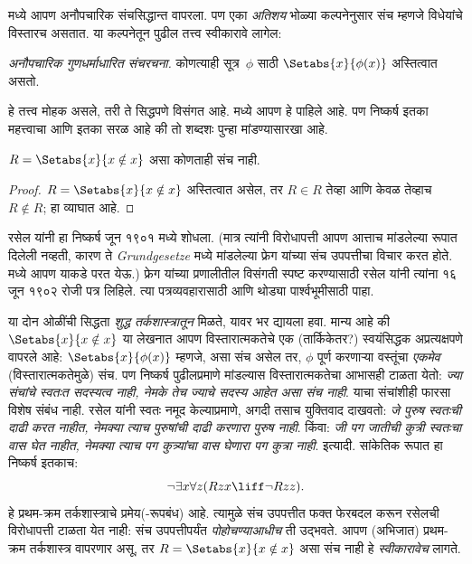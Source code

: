 \documentclass[../../../include/open-logic-section]{subfiles}
\begin{document}

मध्ये आपण अनौपचारिक
संचसिद्धान्त वापरला.
पण एका \emph{अतिशय}
भोळ्या कल्पनेनुसार
संच म्हणजे विधेयांचे
विस्तारच असतात.
या कल्पनेतून पुढील
तत्त्व स्वीकारावे लागेल:

\begin{defish}
  \emph{अनौपचारिक
  गुणधर्माधारित संचरचना.}
  कोणत्याही सूत्र~$\phi$
  साठी
  $\Setabs{x}{\phi(x)}$
  अस्तित्वात असतो.
\end{defish}

हे तत्त्व मोहक
असले, तरी ते
सिद्धपणे विसंगत
आहे. 
मध्ये आपण हे
पाहिले आहे.
पण निष्कर्ष
इतका महत्त्वाचा
आणि इतका
सरळ आहे
की तो
शब्दशः पुन्हा
मांडण्यासारखा आहे.

\begin{thm}[रसेलची विरोधापत्ती]
$R = \Setabs{x}{x \notin x}$
असा कोणताही संच नाही.
\end{thm}

\begin{proof}
$R = \Setabs{x}{x \notin x}$
अस्तित्वात असेल, तर
$R \in R$ तेव्हा
आणि केवळ तेव्हाच
$R \notin R$;
हा व्याघात आहे.
\end{proof}

रसेल यांनी हा
निष्कर्ष जून १९०१
मध्ये शोधला. (मात्र
त्यांनी विरोधापत्ती
आपण आत्ताच
मांडलेल्या रूपात
दिलेली नव्हती,
कारण ते
\emph{Grundgesetze}
मध्ये मांडलेल्या
फ्रेग यांच्या
संच उपपत्तीचा
विचार करत होते.
मध्ये आपण
याकडे परत
येऊ.) फ्रेग
यांच्या प्रणालीतील
विसंगती स्पष्ट
करण्यासाठी रसेल
यांनी त्यांना
१६ जून १९०२
रोजी पत्र
लिहिले. त्या
पत्रव्यवहारासाठी
आणि थोड्या
पार्श्वभूमीसाठी
\citet[pp.~124--8]{Heijenoort1967}
पाहा.

या दोन ओळींची
सिद्धता \emph{शुद्ध
तर्कशास्त्रातून}
मिळते, यावर
भर द्यायला हवा.
मान्य आहे की
$\Setabs{x}{x \notin x}$
या लेखनात
आपण विस्तारात्मकतेचे
एक (तार्किकेतर?)
स्वयंसिद्धक अप्रत्यक्षपणे
वापरले आहे:
$\Setabs{x}{\phi(x)}$
म्हणजे, असा संच
असेल तर,
$\phi$ पूर्ण
करणाऱ्या वस्तूंचा
\emph{एकमेव}
(विस्तारात्मकतेमुळे)
संच. पण निष्कर्ष
पुढीलप्रमाणे
मांडल्यास
विस्तारात्मकतेचा
आभासही टाळता
येतो: \emph{ज्या
संचांचे स्वतःत
सदस्यत्व नाही,
नेमके तेच
ज्याचे सदस्य
आहेत असा
संच नाही}.
याचा संचांशीही
फारसा विशेष
संबंध नाही.
रसेल यांनी
स्वतः नमूद
केल्याप्रमाणे,
अगदी तसाच
युक्तिवाद
दाखवतो:
\emph{जे पुरुष
स्वतःची दाढी
करत नाहीत,
नेमक्या त्याच
पुरुषांची दाढी
करणारा पुरुष
नाही}. किंवा:
\emph{जी पग
जातीची कुत्री
स्वतःचा वास
घेत नाहीत,
नेमक्या त्याच
पग कुत्र्यांचा
वास घेणारा
पग कुत्रा
नाही}. इत्यादी.
सांकेतिक रूपात
हा निष्कर्ष
इतकाच:
\[
\lnot \exists x \forall z(Rzx \liff \lnot R zz).
\]
हे प्रथम-क्रम
तर्कशास्त्राचे
प्रमेय(-रूपबंध)
आहे. त्यामुळे
संच उपपत्तीत
फक्त फेरबदल
करून रसेलची
विरोधापत्ती
टाळता येत
नाही: संच
उपपत्तीपर्यंत
\emph{पोहोचण्याआधीच}
ती उद्भवते.
आपण (अभिजात)
प्रथम-क्रम
तर्कशास्त्र
वापरणार असू,
तर
$R = \Setabs{x}{x\notin x}$
असा संच नाही
हे \emph{स्वीकारावेच}
लागते.
\end{document}
